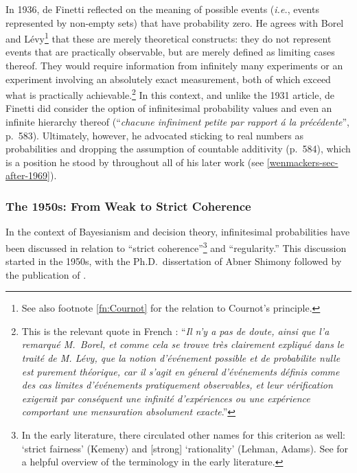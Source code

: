 In 1936, de Finetti reflected on the meaning of possible events (\textit{i.e.}, events represented by non-empty sets) that have probability zero. He agrees with Borel and L{\'{e}}vy\footnote{See also footnote \ref{fn:Cournot} for the relation to Cournot's principle.} that these are merely theoretical constructs: they do not represent events that are practically observable, but are merely defined as limiting cases thereof. They would require information from infinitely many experiments or an experiment involving an absolutely exact measurement, both of which exceed what is practically achievable.\footnote{This is the relevant quote in French \citep[p.~577]{deFinetti:1936}: ``\textit{Il n'y a pas de doute, ainsi que l'a remarqu\'{e} M.\ Borel, et comme cela se trouve tr\`{e}s clairement expliqu\'{e} dans le trait\'{e} de M. L\'{e}vy, que la notion d'\'{e}v\'{e}nement possible et de probabilite nulle est purement th\'{e}orique, car il s'agit en g\'{e}neral d'\'{e}v\'{e}nements d\'{e}finis comme des cas limites d'\'{e}v\'{e}nements pratiquement observables, et leur v\'{e}rification exigerait par cons\'{e}quent une \emph{infinit\'{e}} d'exp\'{e}riences ou une exp\'{e}rience comportant une mensuration absolument \emph{exacte}}.''}
In this context, and unlike the 1931 article, de Finetti did consider the option of infinitesimal probability values and even an infinite hierarchy thereof (``\textit{chacune infiniment petite par rapport \'{a} la pr\'{e}c\'{e}dente}'', p.~583). Ultimately, however, he advocated sticking to real numbers as probabilities and dropping the assumption of countable additivity (p.~584), which is a position he stood by throughout all of his later work (see \autoref{wenmackers-sec-after-1969}).

\subsubsection*{The 1950s: From Weak to Strict Coherence}\label{sec:coherence}
In the context of Bayesianism and decision theory, infinitesimal probabilities have been discussed in relation to ``strict coherence''\footnote{In the early literature, there circulated other names for this criterion as well: `strict fairness' (Kemeny) and [strong] `rationality' (Lehman, Adams). See \citet[p.~114]{Carnap:1971b} for a helpful overview of the terminology in the early literature.} and ``regularity.'' This discussion started in the 1950s, with the Ph.D.\ dissertation of Abner Shimony followed by the publication of \citet{Shimony:1955}.

